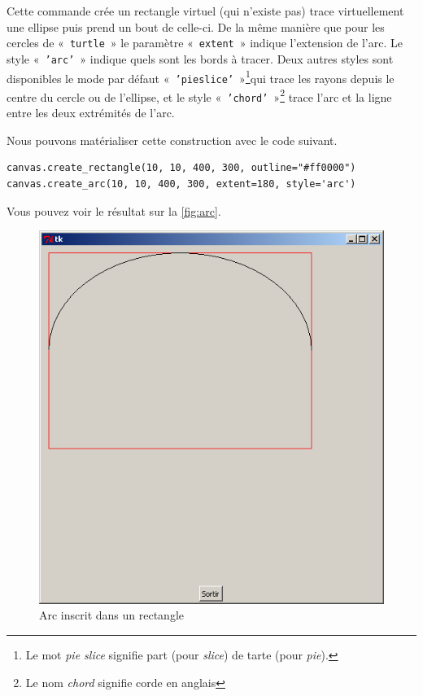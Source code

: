 Cette commande crée un rectangle virtuel (qui n'existe pas) trace virtuellement une ellipse puis prend un bout de celle-ci.
De la même manière que pour les cercles de «~\texttt{turtle}~» le paramètre «~\texttt{extent}~» indique l'extension de l'arc. Le style «~\texttt{'arc'}~» indique quels sont les bords à tracer. Deux autres styles sont disponibles le mode par défaut «~\texttt{'pieslice'}~»\footnote{Le mot \emph{pie slice} signifie part (pour \emph{slice}) de tarte (pour \emph{pie}).}qui trace les rayons depuis le centre du cercle ou de l'ellipse, et le style «~\texttt{'chord'}~»\footnote{Le nom \emph{chord} signifie corde en anglais} trace l'arc et la ligne entre les deux extrémités de l'arc.

Nous pouvons matérialiser cette construction avec le code suivant.

\begin{Verbatim}[frame=single,rulecolor=\color{mbleu}, label=à taper]
canvas.create_rectangle(10, 10, 400, 300, outline="#ff0000")
canvas.create_arc(10, 10, 400, 300, extent=180, style='arc')
\end{Verbatim}

Vous pouvez voir le résultat sur la \autoref{fig:arc}.
\begin{figure}[h!]
\centering
\includegraphics[scale=0.4]{images/arc}
\caption{Arc inscrit dans un rectangle}\label{fig:arc}
\end{figure}

